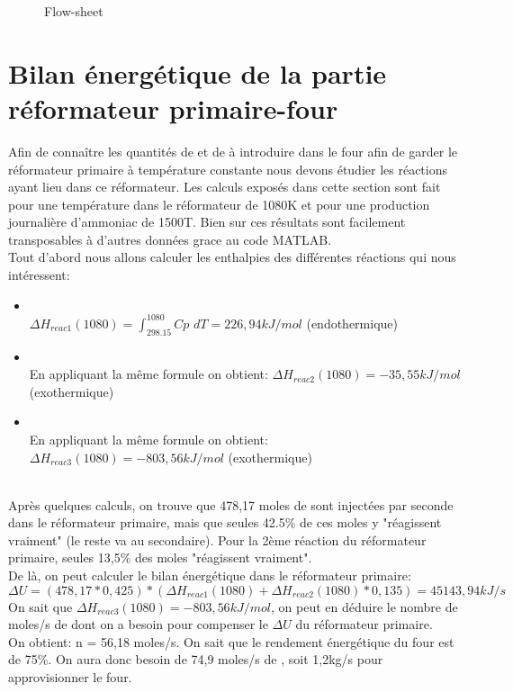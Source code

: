 \documentclass[a4paper, oneside, 12pt]{article}
\begin{document}
\begin{figure}
	
	\caption{Flow-sheet}
\end{figure}


\section{Bilan énergétique de la partie réformateur primaire-four}

Afin de connaître les quantités de  et de  à introduire dans le four afin de garder le réformateur primaire à température constante nous devons étudier les réactions ayant lieu dans ce réformateur. Les calculs exposés dans cette section sont fait pour une température dans le réformateur de 1080K et pour une production journalière d'ammoniac de 1500T. Bien sur ces résultats sont facilement transposables à d'autres données grace au code MATLAB. \\
Tout d'abord nous allons calculer les enthalpies des différentes réactions qui nous intéressent: \\
\begin{itemize}
\item{ \\
$\Delta H_{reac1} (1080)=\int_{298.15}^{1080} Cp$ $dT = 226,94 kJ/mol$ (endothermique)}
\item{ \\
En appliquant la même formule on obtient: $\Delta H_{reac2} (1080) = -35,55 kJ/mol$ (exothermique)}
\item{ \\
En appliquant la même formule on obtient: $\Delta H_{reac3} (1080) = -803,56 kJ/mol$ (exothermique)}
\end{itemize}
\\
Après quelques calculs, on trouve que 478,17 moles de  sont injectées par seconde dans le réformateur primaire, mais que seules 42.5\% de ces moles y "réagissent vraiment" (le reste va au secondaire).
Pour la 2ème réaction du réformateur primaire, seules 13,5\% des moles "réagissent vraiment". \\
De là, on peut calculer le bilan énergétique dans le réformateur primaire: \\
$\Delta U = (478,17 * 0,425) * (\Delta H_{reac1} (1080) + \Delta H_{reac2} (1080) * 0,135) = 45143,94 kJ/s$ \\
On sait que $\Delta H_{reac3} (1080) = -803,56 kJ/mol$, on peut en déduire le nombre de moles/s de  dont on a besoin pour compenser le $\Delta U$ du réformateur primaire. \\
On obtient: n = 56,18 moles/s.
On sait que le rendement énergétique du four est de 75\%.
On aura donc besoin de 74,9 moles/s de , soit 1,2kg/s pour approvisionner le four. 
\end{document}
